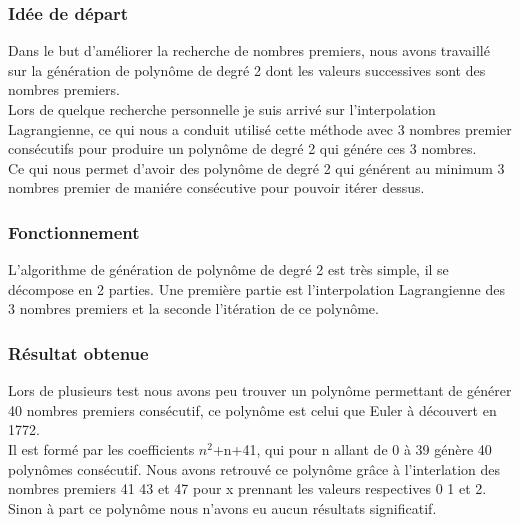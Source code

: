 \subsubsection{Idée de départ}
Dans le but d'améliorer la recherche de nombres premiers, nous avons travaillé sur la génération de polynôme de degré 2 dont les valeurs successives sont des nombres premiers.\\
Lors de quelque recherche personnelle je suis arrivé sur l'interpolation Lagrangienne, ce qui nous a conduit utilisé cette méthode avec 3 nombres premier consécutifs pour produire un polynôme de degré 2 qui génére ces 3 nombres.\\ Ce qui nous permet d'avoir des polynôme de degré 2 qui générent au minimum 3 nombres premier de maniére consécutive pour pouvoir itérer dessus.\\
\subsubsection{Fonctionnement}
L'algorithme de génération de polynôme de degré 2 est très simple, il se décompose en 2 parties. Une première partie est l'interpolation Lagrangienne des 3 nombres premiers et la seconde l'itération de ce polynôme.\\





\subsubsection{Résultat obtenue}
Lors de plusieurs test nous avons peu trouver un polynôme permettant de générer 40 nombres premiers consécutif, ce polynôme est celui que Euler à découvert en 1772.\\ Il est formé par les coefficients $n^2$+n+41, qui pour n allant de 0 à 39 génère 40 polynômes consécutif. Nous avons retrouvé ce polynôme grâce à l'interlation des nombres premiers 41 43 et 47 pour x prennant les valeurs respectives 0 1 et 2.\\ Sinon à part ce polynôme nous n'avons eu aucun résultats significatif.
